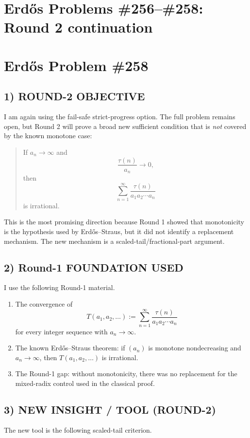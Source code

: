 \section*{Erd\H{o}s Problems \#256--\#258: Round 2 continuation}

\section*{Erd\H{o}s Problem \#258}

\subsection*{1) ROUND-2 OBJECTIVE}
I am again using the fail-safe strict-progress option. The full problem remains open, but Round 2 will prove a broad new sufficient condition that is \emph{not} covered by the known monotone case:

\begin{quote}
If $a_n\to\infty$ and
\[
\frac{\tau(n)}{a_n}\to 0,
\]
then
\[
\sum_{n=1}^{\infty}\frac{\tau(n)}{a_1a_2\cdots a_n}
\]
is irrational.
\end{quote}

This is the most promising direction because Round 1 showed that monotonicity is the hypothesis used by Erd\H{o}s--Straus, but it did not identify a replacement mechanism. The new mechanism is a scaled-tail/fractional-part argument.

\subsection*{2) Round-1 FOUNDATION USED}
I use the following Round-1 material.
\begin{enumerate}
\item The convergence of
\[
T(a_1,a_2,\dots):=\sum_{n=1}^{\infty}\frac{\tau(n)}{a_1a_2\cdots a_n}
\]
for every integer sequence with $a_n\to\infty$.
\item The known Erd\H{o}s--Straus theorem: if $(a_n)$ is monotone nondecreasing and $a_n\to\infty$, then $T(a_1,a_2,\dots)$ is irrational.
\item The Round-1 gap: without monotonicity, there was no replacement for the mixed-radix control used in the classical proof.
\end{enumerate}

\subsection*{3) NEW INSIGHT / TOOL (ROUND-2)}
The new tool is the following scaled-tail criterion.

